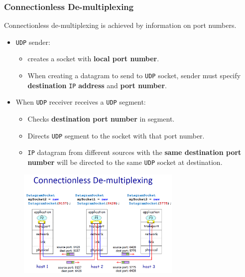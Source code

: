 \documentclass[12pt]{article}
\newcommand\UDP{\texttt{UDP} }
\theoremstyle{definition}
\begin{document}
\subsubsection{Connectionless De-multiplexing}
Connectionless de-multiplexing is achieved by information on port numbers.
\begin{itemize}
  \item \UDP sender:
  \begin{itemize}
    \item creates a socket with \textbf{local port number}.
    \item When creating a datagram to send to \UDP socket, sender must specify \textbf{destination }\texttt{IP}\textbf{ address} and \textbf{port number}.
  \end{itemize}
  \item When \UDP receiver receives a \UDP segment:
  \begin{itemize}
    \item Checks \textbf{destination port number} in segment.
    \item Directs \UDP segment to the socket with that port number.
    \item \texttt{IP} datagram from different sources with the \textbf{same destination port number} will be directed to the same \UDP socket at destination.
  \end{itemize}
\end{itemize}
\begin{figure}[h]
\centering
\includegraphics[width = 0.7\textwidth]{4_2_1.png}
\end{figure}
\end{document}
